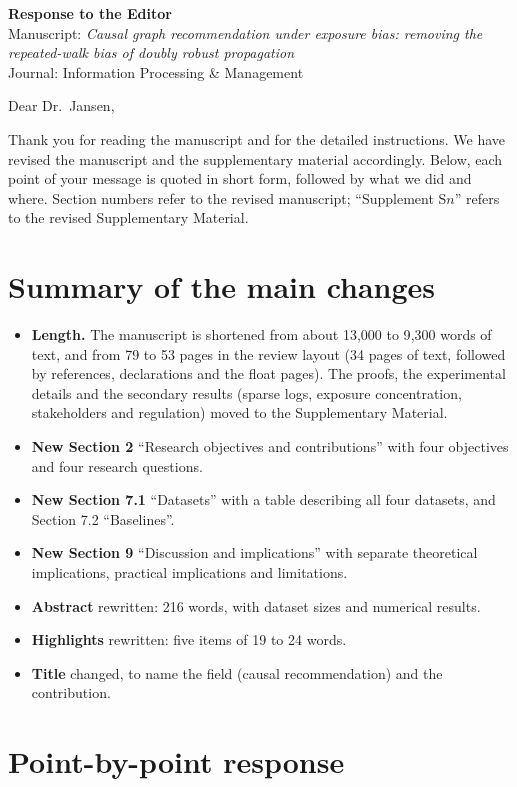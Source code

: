 \documentclass[11pt]{article}
\begin{document}
\begin{center}
{\Large\bfseries Response to the Editor}\\[6pt]
Manuscript: \emph{Causal graph recommendation under exposure bias: removing the repeated-walk bias of doubly robust propagation}\\
Journal: Information Processing \& Management
\end{center}

Dear Dr.\ Jansen,

Thank you for reading the manuscript and for the detailed instructions. We have revised the
manuscript and the supplementary material accordingly. Below, each point of your message is
quoted in short form, followed by what we did and where. Section numbers refer to the revised
manuscript; ``Supplement S$n$'' refers to the revised Supplementary Material.

\section*{Summary of the main changes}
\begin{itemize}[leftmargin=*]
\item \textbf{Length.} The manuscript is shortened from about 13{,}000 to 9{,}300 words of text, and from 79
to 53 pages in the review layout (34 pages of text, followed by references, declarations and the
float pages). The proofs, the experimental details and the secondary results (sparse logs, exposure
concentration, stakeholders and regulation) moved to the Supplementary Material.
\item \textbf{New Section 2} ``Research objectives and contributions'' with four objectives and four research questions.
\item \textbf{New Section 7.1} ``Datasets'' with a table describing all four datasets, and Section 7.2 ``Baselines''.
\item \textbf{New Section 9} ``Discussion and implications'' with separate theoretical implications, practical implications and limitations.
\item \textbf{Abstract} rewritten: 216 words, with dataset sizes and numerical results.
\item \textbf{Highlights} rewritten: five items of 19 to 24 words.
\item \textbf{Title} changed, to name the field (causal recommendation) and the contribution.
\end{itemize}

\section*{Point-by-point response}
\end{document}
